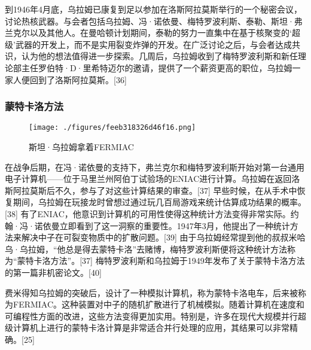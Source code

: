 到1946年4月底，乌拉姆已康复到足以参加在洛斯阿拉莫斯举行的一个秘密会议，讨论热核武器。与会者包括乌拉姆、冯·诺依曼、梅特罗波利斯、泰勒、斯坦·弗兰克尔以及其他人。在曼哈顿计划期间，泰勒的努力一直集中在基于核聚变的‘超级’武器的开发上，而不是实用裂变炸弹的开发。在广泛讨论之后，与会者达成共识，认为他的想法值得进一步探索。几周后，乌拉姆收到了梅特罗波利斯和新任理论部主任罗伯特·D·里希特迈尔的邀请，提供了一个薪资更高的职位，乌拉姆一家人便回到了洛斯阿拉莫斯。[36]
\subsubsection{蒙特卡洛方法}
\begin{figure}[ht]
\centering
\texttt{[image: ./figures/feeb318326d46f16.png]}
\caption{斯坦·乌拉姆拿着FERMIAC} \label{fig_Ulam_4}
\end{figure}
在战争后期，在冯·诺依曼的支持下，弗兰克尔和梅特罗波利斯开始对第一台通用电子计算机——位于马里兰州阿伯丁试验场的ENIAC进行计算。乌拉姆在返回洛斯阿拉莫斯后不久，参与了对这些计算结果的审查。[37] 早些时候，在从手术中恢复期间，乌拉姆在玩接龙时曾想过通过玩几百局游戏来统计估算成功结果的概率。[38] 有了ENIAC，他意识到计算机的可用性使得这种统计方法变得非常实际。约翰·冯·诺依曼立即看到了这一洞察的重要性。1947年3月，他提出了一种统计方法来解决中子在可裂变物质中的扩散问题。[39] 由于乌拉姆经常提到他的叔叔米哈乌·乌拉姆，“他总是得去蒙特卡洛”去赌博，梅特罗波利斯便将这种统计方法称为“蒙特卡洛方法”。[37] 梅特罗波利斯和乌拉姆于1949年发布了关于蒙特卡洛方法的第一篇非机密论文。[40]

费米得知乌拉姆的突破后，设计了一种模拟计算机，称为蒙特卡洛电车，后来被称为FERMIAC。这种装置对中子的随机扩散进行了机械模拟。随着计算机在速度和可编程性方面的改进，这些方法变得更加实用。特别是，许多在现代大规模并行超级计算机上进行的蒙特卡洛计算是非常适合并行处理的应用，其结果可以非常精确。[25]

